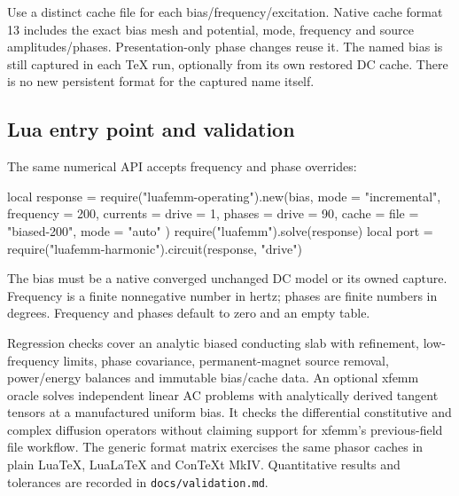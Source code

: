 Use a distinct cache file for each bias/frequency/excitation. Native cache
format 13 includes the exact bias mesh and potential, mode, frequency and
source amplitudes/phases. Presentation-only phase changes reuse it. The named
bias is still captured in each TeX run, optionally from its own restored DC
cache. There is no new persistent format for the captured name itself.

\subsection{Lua entry point and validation}
The same numerical API accepts frequency and phase overrides:
\begin{codeexample}
local response = require("luafemm-operating").new(bias, {
  mode = "incremental", frequency = 200,
  currents = {drive = 1}, phases = {drive = 90},
  cache = {file = "biased-200", mode = "auto"}
})
require("luafemm").solve(response)
local port = require("luafemm-harmonic").circuit(response, "drive")
\end{codeexample}
The bias must be a native converged unchanged DC model or its owned capture.
Frequency is a finite nonnegative number in hertz; phases are finite numbers
in degrees. Frequency and phases default to zero and an empty table.

Regression checks cover an analytic biased conducting slab with refinement,
low-frequency limits, phase covariance, permanent-magnet source removal,
power/energy balances and immutable bias/cache data. An optional xfemm oracle
solves independent linear AC problems with analytically derived tangent tensors
at a manufactured uniform bias. It checks the differential constitutive and
complex diffusion operators without claiming support for xfemm's previous-field
file workflow. The generic format matrix exercises the same phasor caches in
plain LuaTeX, LuaLaTeX and ConTeXt MkIV. Quantitative results and tolerances are
recorded in \nolinkurl{docs/validation.md}.

